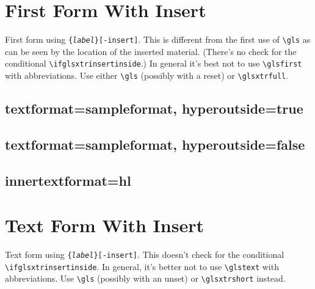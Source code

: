\documentclass{report}
\newcommand{\marg}[1]{\{\textnormal{\emph{#1}}\}}
\begin{document}

\chapter{First Form With Insert}
First form using \texttt{\string\glsfirst\marg{label}[-insert]}.
This is different from the first use of \verb|\gls|
as can be seen by the location of the inserted material.
(There's no check for the conditional 
\verb|\ifglsxtrinsertinside|.) In general it's best not
to use \verb|\glsfirst| with abbreviations. Use either
\verb|\gls| (possibly with a reset) or \verb|\glsxtrfull|.


\section{textformat=sampleformat, hyperoutside=true}


\section{textformat=sampleformat, hyperoutside=false}


\section{innertextformat=hl}


\chapter{Text Form With Insert}
Text form using \texttt{\string\glstext\marg{label}[-insert]}.
This doesn't check for the conditional 
\verb|\ifglsxtrinsertinside|.
In general, it's better not to use \verb|\glstext| with
abbreviations. Use \verb|\gls| (possibly with an unset) 
or \verb|\glsxtrshort| instead.
\end{document}
